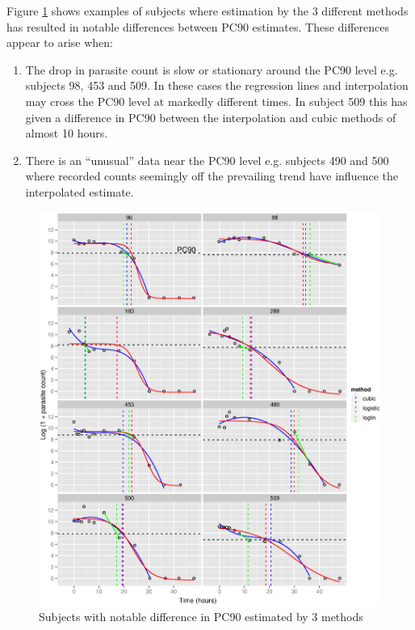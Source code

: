 Figure \ref{pc90-bad} shows examples of subjects where estimation by the 3 different methods has resulted in notable differences between PC90 estimates. These differences appear to arise when:
\begin{enumerate}
\item The drop in parasite count is slow or stationary around the PC90 level e.g. subjects 98, 453 and 509. In these cases the regression lines and interpolation may cross the PC90 level at markedly different times. In subject 509 this has given a difference in PC90 between the interpolation and cubic methods of almost 10 hours.
\item There is an ``unusual'' data near the PC90 level e.g. subjects 490 and 500 where recorded counts seemingly off the prevailing trend have influence the interpolated estimate.  
\end{enumerate}
\begin{figure}[h]
\includegraphics[width=6.5in]{pc90-bad.eps} 
\caption{Subjects with notable difference in PC90 estimated by 3 methods}
\label{pc90-bad}
\end{figure}
